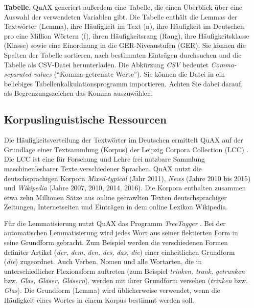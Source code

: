 \documentclass[11pt]{article}\usepackage[]{graphicx}\usepackage[]{color}
\begin{document}
\noindent \textbf{Tabelle}. QuAX generiert außerdem eine Tabelle, die einen Überblick über eine Auswahl der verwendeten Variablen gibt. Die Tabelle enthält die Lemmas der Textwörter (Lemma), ihre Häufigkeit im Text (n), ihre Häufigkeit im Deutschen pro eine Million Wörtern (f), ihren Häufigkeitsrang (Rang), ihre Häufigkeitsklasse (Klasse) sowie eine Einordnung in die GER-Niveaustufen (GER). Sie können die Spalten der Tabelle sortieren, nach bestimmten Einträgen durchsuchen und die Tabelle als CSV-Datei herunterladen. Die Abkürzung \textit{CSV} bedeutet \textit{Comma-separated values} ("`Komma-getrennte Werte"'). Sie können die Datei in ein beliebiges Tabellenkalkulationsprogramm importieren. Achten Sie dabei darauf, als Begrenzungszeichen das Komma auszuwählen. 

\subsection{Korpuslinguistische Ressourcen}

Die Häufigkeitsverteilung der Textwörter im Deutschen ermittelt QuAX auf der Grundlage einer Textsammlung (Korpus) der Leipzig Corpora Collection (LCC) \parencite{Goldhahn.2012}. Die LCC ist eine für Forschung und Lehre frei nutzbare Sammlung maschinenlesbarer Texte verschiedener Sprachen. QuAX nutzt die deutschsprachigen Korpora \textit{Mixed-typical} (Jahr 2011), \textit{News} (Jahre 2010 bis 2015) und \textit{Wikipedia} (Jahre 2007, 2010, 2014, 2016). Die Korpora enthalten zusammen etwa zehn Millionen Sätze aus online gecrawlten Texten deutschsprachiger Zeitungen, Internetseiten und Einträgen in dem online Lexikon Wikipedia.

Für die Lemmatisierung nutzt QuAX das Programm \textit{TreeTagger} \parencite{Schmid.1995}. Bei der automatischen Lemmatisierung wird jedes Wort aus seiner flektierten Form in seine Grundform gebracht. Zum Beispiel werden die verschiedenen Formen definiter Artikel (\textit{der, dem, den, des, das, die}) einer einheitlichen Grundform (\textit{die}) zugeordnet. Auch Verben, Nomen und alle Wortarten, die in unterschiedlicher Flexionsform auftreten (zum Beispiel \textit{trinken, trank, getrunken} bzw. \textit{Glas, Gläser, Gläsern}), werden mit ihrer Grundform versehen (\textit{trinken} bzw. \textit{Glas}). Die Grundform (Lemma) wird üblicherweise verwendet, wenn die Häufigkeit eines Wortes in einem Korpus bestimmt werden soll. 
\end{document}
